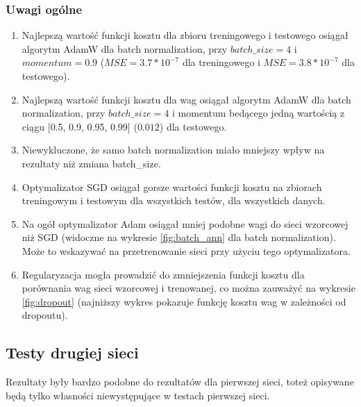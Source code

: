 \documentclass[12pt]{article}
\begin{document}
\subsubsection{Uwagi ogólne}
\begin{enumerate}
	\item Najlepszą wartość funkcji kosztu dla zbioru treningowego i testowego osiągał algorytm AdamW dla batch normalization, przy $batch\_size=4$ i $momentum=0.9$ ($MSE=3.7*10^{-7}$ dla treningowego i $MSE=3.8*10^{-7}$ dla testowego).
	\item Najlepszą wartość funkcji kosztu dla wag osiągał algorytm AdamW dla batch normalization, przy $batch\_size=4$ i momentum bedącego jedną wartością z ciągu [0.5, 0.9, 0.95, 0.99] ($0.012$) dla testowego.
	\item Niewykluczone, że samo batch normalization miało mniejszy wpływ na rezultaty niż zmiana batch\_size.
	\item Optymalizator SGD osiągał gorsze wartości funkcji kosztu na zbiorach treningowym i testowym dla wszystkich testów, dla wszystkich danych.
	\item Na ogół optymalizator Adam osiągał mniej podobne wagi do sieci wzorcowej niż SGD (widoczne na wykresie \ref{fig:batch_ann} dla batch normalization). Może to wskazywać na przetrenowanie sieci przy użyciu tego optymalizatora.
	\item Regularyzacja mogła prowadzić do zmniejszenia funkcji kosztu dla porównania wag sieci wzorcowej i trenowanej, co można zauważyć na wykresie \ref{fig:dropout} (najniższy wykres pokazuje funkcję kosztu wag w zależności od dropoutu).
\end{enumerate}





\subsection{Testy drugiej sieci}\label{tit:cnn}
Rezultaty były bardzo podobne do rezultatów dla pierwszej sieci, toteż opisywane będą tylko własności niewystępujące w testach pierwszej sieci.
\end{document}

